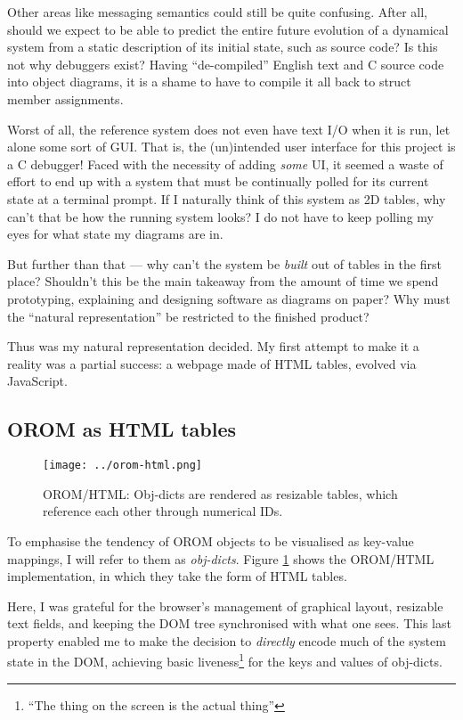 Other areas like messaging semantics could still be quite confusing.
After all, should we expect to be able to predict the entire future
evolution of a dynamical system from a static description of its initial
state, such as source code? Is this not why debuggers exist? Having
``de-compiled'' English text and C source code into object diagrams, it
is a shame to have to compile it all back to struct member assignments.

Worst of all, the reference system does not even have text I/O when it
is run, let alone some sort of GUI. That is, the (un)intended user
interface for this project is a C debugger! Faced with the necessity of
adding \emph{some} UI, it seemed a waste of effort to end up with a
system that must be continually polled for its current state at a
terminal prompt. If I naturally think of this system as 2D tables, why
can't that be how the running system looks? I do not have to keep
polling my eyes for what state my diagrams are in.

But further than that --- why can't the system be \emph{built} out of
tables in the first place? Shouldn't this be the main takeaway from the
amount of time we spend prototyping, explaining and designing software
as diagrams on paper? Why must the ``natural representation'' be
restricted to the finished product?

Thus was my natural representation decided. My first attempt to make it
a reality was a partial success: a webpage made of HTML tables, evolved
via JavaScript.

\hypertarget{orom-as-html-tables}{%
\subsection{OROM as HTML tables}\label{orom-as-html-tables}}

\begin{figure}[h]
  \centering
  \texttt{[image: ../orom-html.png]}
  \caption{OROM/HTML: Obj-dicts are rendered as resizable tables, which reference
           each other through numerical IDs. \label{fig:orom-html}}
\end{figure}

To emphasise the tendency of OROM objects to be visualised as key-value
mappings, I will refer to them as \emph{obj-dicts}. Figure
\ref{fig:orom-html} shows the OROM/HTML implementation, in which they
take the form of HTML tables.

Here, I was grateful for the browser's management of graphical layout,
resizable text fields, and keeping the DOM tree synchronised with what
one sees. This last property enabled me to make the decision to
\emph{directly} encode much of the system state in the DOM, achieving
basic liveness\footnote{``The thing on the screen is the actual thing''}
for the keys and values of obj-dicts.

